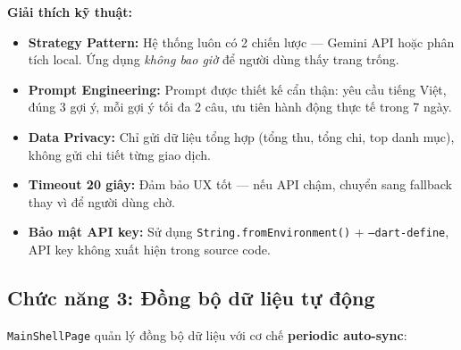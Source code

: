 \textbf{Giải thích kỹ thuật:}
\begin{itemize}
  \item \textbf{Strategy Pattern:} Hệ thống luôn có 2 chiến lược --- Gemini API hoặc phân tích local. Ứng dụng \textit{không bao giờ} để người dùng thấy trang trống.
  \item \textbf{Prompt Engineering:} Prompt được thiết kế cẩn thận: yêu cầu tiếng Việt, đúng 3 gợi ý, mỗi gợi ý tối đa 2 câu, ưu tiên hành động thực tế trong 7 ngày.
  \item \textbf{Data Privacy:} Chỉ gửi dữ liệu tổng hợp (tổng thu, tổng chi, top danh mục), không gửi chi tiết từng giao dịch.
  \item \textbf{Timeout 20 giây:} Đảm bảo UX tốt --- nếu API chậm, chuyển sang fallback thay vì để người dùng chờ.
  \item \textbf{Bảo mật API key:} Sử dụng \texttt{String.fromEnvironment()} + \texttt{--dart-define}, API key không xuất hiện trong source code.
\end{itemize}

\subsection{Chức năng 3: Đồng bộ dữ liệu tự động}

\texttt{MainShellPage} quản lý đồng bộ dữ liệu với cơ chế \textbf{periodic auto-sync}:

